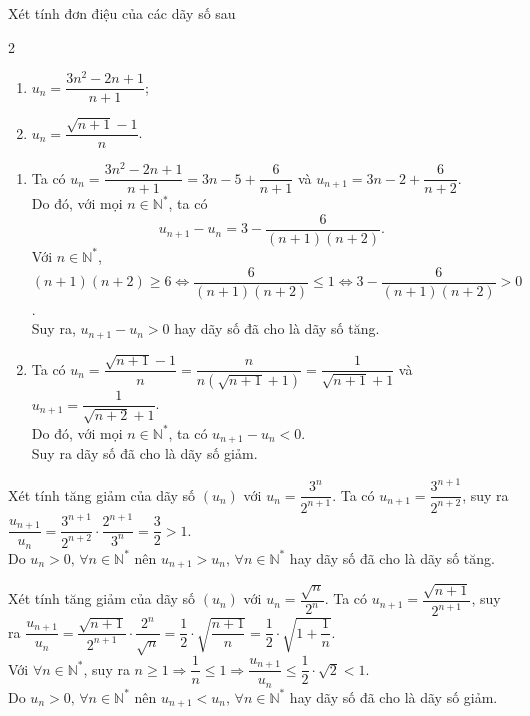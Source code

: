 \begin{vd}%
	Xét tính đơn điệu của các dãy số sau
	\begin{multicols}{2}
		\begin{enumerate}
			\item $u_n=\dfrac{3n^2-2n+1}{n+1}$;
			\item $u_n=\dfrac{\sqrt{n+1}-1}{n}$.
		\end{enumerate}
	\end{multicols}
	\loigiai 
	{
		\begin{enumerate}
			\item Ta có $u_n=\dfrac{3n^2-2n+1}{n+1}=3n-5+\dfrac{6}{n+1}$ và $u_{n+1}=3n-2+\dfrac{6}{n+2}$.\\
			Do đó, với mọi $n\in \mathbb{N}^*$, ta có $$u_{n+1}-u_n=3-\dfrac{6}{(n+1)(n+2)}.$$
			Với $n\in \mathbb{N}^*$, $(n+1)(n+2)\ge 6\Leftrightarrow \dfrac{6}{(n+1)(n+2)}\le 1\Leftrightarrow 3-\dfrac{6}{(n+1)(n+2)}>0$.\\
			Suy ra, $u_{n+1}-u_n>0$ hay dãy số đã cho là dãy số tăng.
			\item Ta có $u_n=\dfrac{\sqrt{n+1}-1}{n}=\dfrac{n}{n\left(\sqrt{n+1}+1\right)}=\dfrac{1}{\sqrt{n+1}+1}$ và $u_{n+1}=\dfrac{1}{\sqrt{n+2}+1}$.\\
			Do đó, với mọi $n\in \mathbb{N}^*$, ta có $u_{n+1}-u_n<0$.\\
			Suy ra dãy số đã cho là dãy số giảm.
		\end{enumerate}
	}
\end{vd}

\begin{vd}%
Xét tính tăng giảm của dãy số $(u_n)$ với $u_n=\dfrac{3^n}{2^{n+1}}$.
	\loigiai 
	{
	Ta có $u_{n+1}=\dfrac{3^{n+1}}{2^{n+2}}$, suy ra $\dfrac{u_{n+1}}{u_n}=\dfrac{3^{n+1}}{2^{n+2}}\cdot \dfrac{2^{n+1}}{3^n}=\dfrac{3}{2}>1$.\\
	Do $u_n>0,\, \forall n\in\mathbb{N}^*$ nên $u_{n+1}>u_n, \, \forall n\in\mathbb{N}^*$ hay dãy số đã cho là dãy số tăng.
	}
\end{vd}

\begin{vd}%
	Xét tính tăng giảm của dãy số $(u_n)$ với $u_n=\dfrac{\sqrt{n}}{2^n}$.
	\loigiai 
	{
		Ta có $u_{n+1}=\dfrac{\sqrt{n+1}}{2^{n+1}}$, suy ra $\dfrac{u_{n+1}}{u_n}=\dfrac{\sqrt{n+1}}{2^{n+1}}\cdot \dfrac{2^n}{\sqrt{n}}=\dfrac{1}{2}\cdot\sqrt{\dfrac{n+1}{n}}=\dfrac{1}{2}\cdot\sqrt{1+\dfrac{1}{n}}$.\\
		Với $\forall n\in\mathbb{N}^*$, suy ra $n\ge 1\Rightarrow \dfrac{1}{n}\le 1\Rightarrow\dfrac{u_{n+1}}{u_n}\le \dfrac{1}{2}\cdot\sqrt{2}<1$.\\
		Do $u_n>0,\, \forall n\in\mathbb{N}^*$ nên $u_{n+1}<u_n, \, \forall n\in\mathbb{N}^*$ hay dãy số đã cho là dãy số giảm.
	}
\end{vd}

